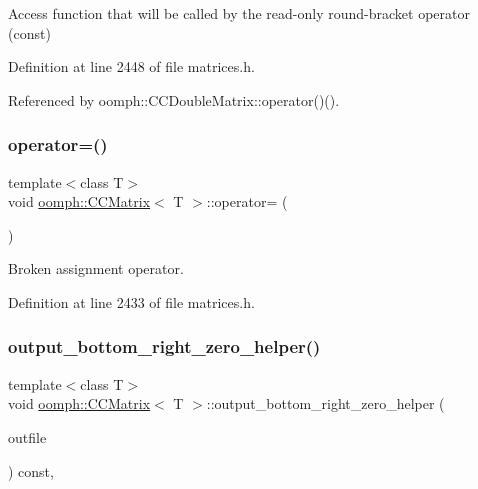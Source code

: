 Access function that will be called by the read-\/only round-\/bracket operator (const) 



Definition at line 2448 of file matrices.\+h.



Referenced by oomph\+::\+C\+C\+Double\+Matrix\+::operator()().

\mbox{\label{classoomph_1_1CCMatrix_ac3612b9c4bbaa346c649cd4790a91df8}} 
\subsubsection{\texorpdfstring{operator=()}{operator=()}}
{\footnotesize\ttfamily template$<$class T$>$ \\
void \hyperlink{classoomph_1_1CCMatrix}{oomph\+::\+C\+C\+Matrix}$<$ T $>$\+::operator= (\begin{DoxyParamCaption}\item[{const \hyperlink{classoomph_1_1CCMatrix}{C\+C\+Matrix}$<$ T $>$ \&}]{ }\end{DoxyParamCaption})\hspace{0.3cm}{\ttfamily [inline]}}



Broken assignment operator. 



Definition at line 2433 of file matrices.\+h.

\mbox{\label{classoomph_1_1CCMatrix_ac3b138b2ed470866999f2a92f3e1f239}} 
\subsubsection{\texorpdfstring{output\+\_\+bottom\+\_\+right\+\_\+zero\+\_\+helper()}{output\_bottom\_right\_zero\_helper()}}
{\footnotesize\ttfamily template$<$class T$>$ \\
void \hyperlink{classoomph_1_1CCMatrix}{oomph\+::\+C\+C\+Matrix}$<$ T $>$\+::output\+\_\+bottom\+\_\+right\+\_\+zero\+\_\+helper (\begin{DoxyParamCaption}\item[{std\+::ostream \&}]{outfile }\end{DoxyParamCaption}) const\hspace{0.3cm}{\ttfamily [inline]}, {\ttfamily [virtual]}}



